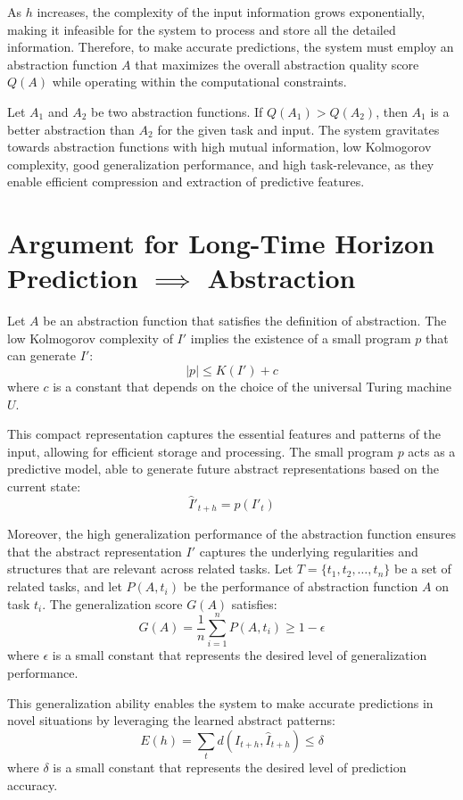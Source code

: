 \documentclass[12pt]{article}
\begin{document}
As $h$ increases, the complexity of the input information grows exponentially, making it infeasible for the system to process and store all the detailed information. Therefore, to make accurate predictions, the system must employ an abstraction function $A$ that maximizes the overall abstraction quality score $Q(A)$ while operating within the computational constraints.

Let $A_1$ and $A_2$ be two abstraction functions. If $Q(A_1) > Q(A_2)$, then $A_1$ is a better abstraction than $A_2$ for the given task and input. The system gravitates towards abstraction functions with high mutual information, low Kolmogorov complexity, good generalization performance, and high task-relevance, as they enable efficient compression and extraction of predictive features.

\section{Argument for Long-Time Horizon Prediction $\implies$ Abstraction}
Let $A$ be an abstraction function that satisfies the definition of abstraction. The low Kolmogorov complexity of $I'$ implies the existence of a small program $p$ that can generate $I'$:
$$|p| \leq K(I') + c$$
where $c$ is a constant that depends on the choice of the universal Turing machine $U$.

This compact representation captures the essential features and patterns of the input, allowing for efficient storage and processing. The small program $p$ acts as a predictive model, able to generate future abstract representations based on the current state:
$$\hat{I}'_{t+h} = p(I'_t)$$

Moreover, the high generalization performance of the abstraction function ensures that the abstract representation $I'$ captures the underlying regularities and structures that are relevant across related tasks. Let $T = \{t_1, t_2, \ldots, t_n\}$ be a set of related tasks, and let $P(A, t_i)$ be the performance of abstraction function $A$ on task $t_i$. The generalization score $G(A)$ satisfies:
$$G(A) = \frac{1}{n} \sum_{i=1}^n P(A, t_i) \geq 1 - \epsilon$$
where $\epsilon$ is a small constant that represents the desired level of generalization performance.

This generalization ability enables the system to make accurate predictions in novel situations by leveraging the learned abstract patterns:
$$E(h) = \sum_{t} d(I_{t+h}, \hat{I}_{t+h}) \leq \delta$$
where $\delta$ is a small constant that represents the desired level of prediction accuracy.
\end{document}
